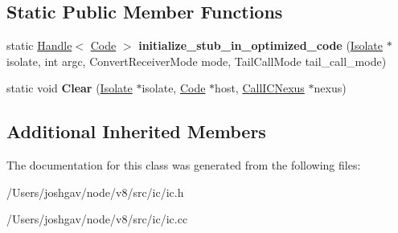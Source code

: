 \subsection*{Static Public Member Functions}
\begin{DoxyCompactItemize}
\item 
static \hyperlink{classv8_1_1internal_1_1_handle}{Handle}$<$ \hyperlink{classv8_1_1internal_1_1_code}{Code} $>$ {\bfseries initialize\+\_\+stub\+\_\+in\+\_\+optimized\+\_\+code} (\hyperlink{classv8_1_1internal_1_1_isolate}{Isolate} $\ast$isolate, int argc, Convert\+Receiver\+Mode mode, Tail\+Call\+Mode tail\+\_\+call\+\_\+mode)\hypertarget{classv8_1_1internal_1_1_call_i_c_a65e68f20ffedf1a9e7ba73e34a9afa72}{}\label{classv8_1_1internal_1_1_call_i_c_a65e68f20ffedf1a9e7ba73e34a9afa72}

\item 
static void {\bfseries Clear} (\hyperlink{classv8_1_1internal_1_1_isolate}{Isolate} $\ast$isolate, \hyperlink{classv8_1_1internal_1_1_code}{Code} $\ast$host, \hyperlink{classv8_1_1internal_1_1_call_i_c_nexus}{Call\+I\+C\+Nexus} $\ast$nexus)\hypertarget{classv8_1_1internal_1_1_call_i_c_a30dad0131964e814e98211c4cb5e8a2a}{}\label{classv8_1_1internal_1_1_call_i_c_a30dad0131964e814e98211c4cb5e8a2a}

\end{DoxyCompactItemize}
\subsection*{Additional Inherited Members}


The documentation for this class was generated from the following files\+:\begin{DoxyCompactItemize}
\item 
/\+Users/joshgav/node/v8/src/ic/ic.\+h\item 
/\+Users/joshgav/node/v8/src/ic/ic.\+cc\end{DoxyCompactItemize}
